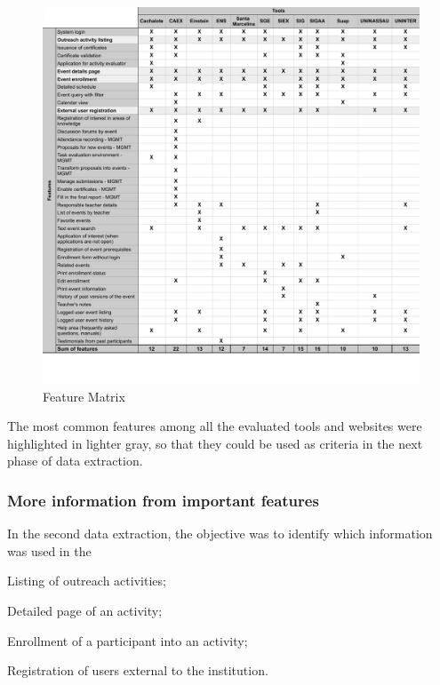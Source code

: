 \begin{figure}[htb]
  \caption{Feature Matrix}\label{fig:gl-matrix}
  \begin{center}
    \includegraphics[width=16cm]{img/functionality-matrix.pdf}
  \end{center}
\end{figure}

The most common features among all the evaluated tools and websites were highlighted in lighter gray, so that they could be used as criteria in the next phase of data extraction.

\subsubsection{More information from important features}\label{sec:gl-data-extraction-2}

In the second data extraction, the objective was to identify which information was used in the
\begin{inparaenum}[(i)]
  \item Listing of outreach activities;
  \item Detailed page of an activity;
  \item Enrollment of a participant into an activity;
  \item Registration of users external to the institution.
\end{inparaenum}


